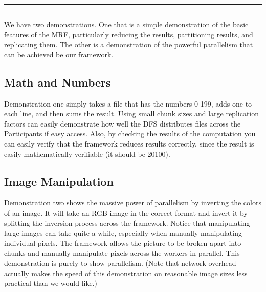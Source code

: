 \documentclass[11pt]{article}
\newcounter{questionCounter}
\newcounter{partCounter}[questionCounter]
\newenvironment{question}[2][\arabic{questionCounter}]{%
    \setcounter{partCounter}{0}%
    \vspace{.25in} \hrule \vspace{0.5em}%
        \noindent{\bf #2}%
    \vspace{0.8em} \hrule \vspace{.10in}%
    \addtocounter{questionCounter}{1}%
}{}
\begin{document}
\begin{question}{Section 4 - Demonstrations}
We have two demonstrations. One that is a simple demonstration of the basic features of the MRF, particularly reducing the results, partitioning results, and replicating them. The other is a demonstration of the powerful parallelism that can be achieved be our framework.

\subsection*{Math and Numbers}
Demonstration one simply takes a file that has the numbers 0-199, adds one to each line, and then sums the result. Using small chunk sizes and large replication factors can easily demonstrate how well the DFS distributes files across the Participants if easy access. Also, by checking the results of the computation you can easily verify that the framework reduces results correctly, since the result is easily mathematically verifiable (it should be 20100). 

\subsection*{Image Manipulation}
Demonstration two shows the massive power of parallelism by inverting the colors of an image. It will take an RGB image in the correct format and invert it by splitting the inversion process across the framework. Notice that manipulating large images can take quite a while, especially when manually manipulating individual pixels. The framework allows the picture to be broken apart into chunks and manually manipulate pixels across the workers in parallel. This demonstration is purely to show parallelism. (Note that network overhead actually makes the speed of this demonstration on reasonable image sizes less practical than we would like.)


\end{question}
\end{document}
